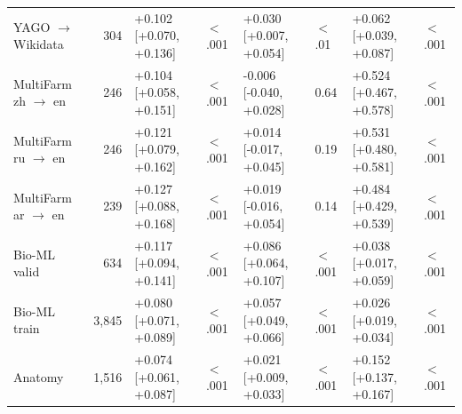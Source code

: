 \begin{tabular}{@{}lrllllll@{}}
YAGO $\to$ Wikidata & 304 & +0.102 [+0.070, +0.136] & $<$.001 & +0.030 [+0.007, +0.054] & $<$.01 & +0.062 [+0.039, +0.087] & $<$.001 \\
MultiFarm zh $\to$ en & 246 & +0.104 [+0.058, +0.151] & $<$.001 & -0.006 [-0.040, +0.028] & 0.64 & +0.524 [+0.467, +0.578] & $<$.001 \\
MultiFarm ru $\to$ en & 246 & +0.121 [+0.079, +0.162] & $<$.001 & +0.014 [-0.017, +0.045] & 0.19 & +0.531 [+0.480, +0.581] & $<$.001 \\
MultiFarm ar $\to$ en & 239 & +0.127 [+0.088, +0.168] & $<$.001 & +0.019 [-0.016, +0.054] & 0.14 & +0.484 [+0.429, +0.539] & $<$.001 \\
Bio-ML valid & 634 & +0.117 [+0.094, +0.141] & $<$.001 & +0.086 [+0.064, +0.107] & $<$.001 & +0.038 [+0.017, +0.059] & $<$.001 \\
Bio-ML train & 3,845 & +0.080 [+0.071, +0.089] & $<$.001 & +0.057 [+0.049, +0.066] & $<$.001 & +0.026 [+0.019, +0.034] & $<$.001 \\
Anatomy & 1,516 & +0.074 [+0.061, +0.087] & $<$.001 & +0.021 [+0.009, +0.033] & $<$.001 & +0.152 [+0.137, +0.167] & $<$.001 \\
\bottomrule
\end{tabular}
